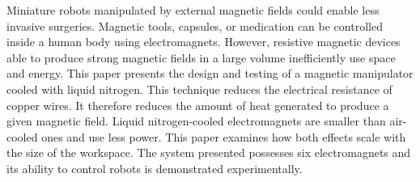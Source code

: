 


Miniature robots manipulated by external magnetic fields could enable less invasive surgeries. Magnetic tools, capsules, or medication can be controlled inside a human body using electromagnets. However, resistive magnetic devices able to produce strong magnetic fields in a large volume inefficiently use space and energy. This paper presents the design and testing of a magnetic manipulator cooled with liquid nitrogen. This technique reduces the electrical resistance of copper wires. It therefore reduces the amount of heat generated to produce a given magnetic field. Liquid nitrogen-cooled electromagnets are smaller than air-cooled ones and use less power. This paper examines how both effects scale with the size of the workspace. %
The system presented possesses six electromagnets and its ability to control robots is demonstrated experimentally.